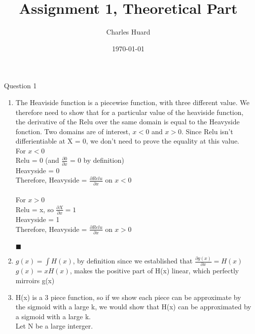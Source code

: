 \documentclass{article}
\title{Assignment 1, Theoretical Part}
\author{Charles Huard}
\date{\today}
\begin{document}
\maketitle

\vspace{0.5cm}


 Question 1 \\
  \begin{enumerate}

    \item
	The Heaviside function is a piecewise function, with three different value. We therefore need to show that for a particular value of the heaviside function, the derivative of the Relu over    	the same domain is equal to the Heavyside fonction. Two domains are of interest, $x < 0$ and $x > 0$. Since Relu isn't differientiable at X = 0, we don't need to prove the equality at this 		          value.\\

	For $x < 0$\\
	Relu = 0 (and  $\frac{\partial 0}{\partial x}$ = 0 by definition) \\
	Heavyside = 0 \\
	Therefore, Heavyside = $\frac{\partial Relu}{\partial x}$ on $x < 0$\\ \\

	
	For $x > 0$\\
	Relu = x, so $\frac{\partial X}{\partial x} = 1$  \\
	Heavyside = 1 \\
	Therefore, Heavyside = $\frac{\partial Relu}{\partial x}$ on $x > 0$\\ \\

	 $\blacksquare$

	\item
		$ g(x) = \int H(x)$, by definition since we established that $\frac{\partial g(x)}{\partial x} = H(x)$\\

		
		$ g(x) = xH(x)$, makes the positive part of H(x) linear, which perfectly mirroirs g(x)

	\item 
		H(x) is a 3 piece function, so if we show each piece can be approximate by the sigmoid with a large k, we would show that H(x) can be approximated by a sigmoid with a large k.\\

		Let N be a large interger.\\


\end{enumerate}
\end{document}
